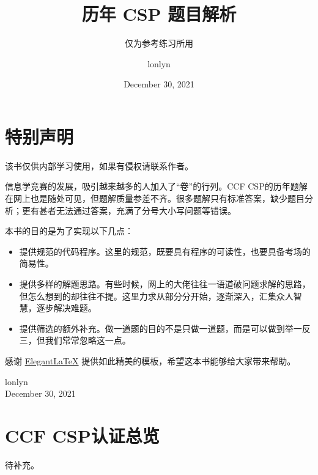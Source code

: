 \documentclass[cn,10pt,math=newtx,citestyle=gb7714-2015,bibstyle=gb7714-2015]{elegantbook}
\title{历年 CSP 题目解析}
\subtitle{仅为参考练习所用}
\author{lonlyn}
\institute{Shanxi University Algorithm Group}
\date{December 30, 2021}
\begin{document}
\maketitle
\frontmatter

\chapter*{特别声明}


该书仅供内部学习使用，如果有侵权请联系作者。

信息学竞赛的发展，吸引越来越多的人加入了“卷”的行列。CCF CSP的历年题解在网上也是随处可见，但题解质量参差不齐。很多题解只有标准答案，缺少题目分析；更有甚者无法通过答案，充满了分号大小写问题等错误。

本书的目的是为了实现以下几点：

\begin{itemize}
  \item 提供规范的代码程序。这里的规范，既要具有程序的可读性，也要具备考场的简易性。
  \item 提供多样的解题思路。有些时候，网上的大佬往往一语道破问题求解的思路，但怎么想到的却往往不提。这里力求从部分分开始，逐渐深入，汇集众人智慧，逐步解决难题。
  \item 提供筛选的额外补充。做一道题的目的不是只做一道题，而是可以做到举一反三，但我们常常忽略这一点。
\end{itemize}

感谢 \href{https://github.com/ElegantLaTeX/ElegantBook}{Elegant\LaTeX{}} 提供如此精美的模板，希望这本书能够给大家带来帮助。

\vskip 1.5cm

\begin{flushright}
lonlyn\\
December 30, 2021
\end{flushright}

\tableofcontents

\mainmatter

\chapter{CCF CSP认证总览}

待补充。

\end{document}
